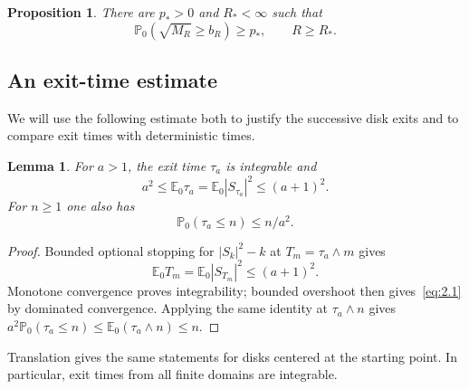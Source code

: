 \documentclass[11pt,letterpaper,reqno]{amsart}
\numberwithin{equation}{section}
\newtheorem{proposition}[theorem]{Proposition}
\newtheorem{lemma}[theorem]{Lemma}
\theoremstyle{remark}
\begin{document}
\begin{proposition}\label{prop:seed}
There are $p_*>0$ and $R_*<\infty$ such that
\begin{equation}\label{eq:1.5}
\mathbb P_0(\sqrt{M_R}\ge b_R)\ge p_*,\qquad R\ge R_*.
\end{equation}
\end{proposition}

\subsection{An exit-time estimate}
We will use the following estimate both to justify the successive disk exits and to compare exit times with deterministic times.
\begin{lemma}\label{lem:exit}
For $a>1$, the exit time $\tau_a$ is integrable and
\begin{equation}\label{eq:2.1}
a^2\le\mathbb E_0\tau_a=\mathbb E_0|S_{\tau_a}|^2\le(a+1)^2.
\end{equation}
For $n\ge1$ one also has
\begin{equation}\label{eq:2.2}
\mathbb P_0(\tau_a\le n)\le n/a^2.
\end{equation}
\end{lemma}
\begin{proof}
Bounded optional stopping for $|S_k|^2-k$ at $T_m=\tau_a\wedge m$ gives
\begin{equation}\label{eq:2.3}
\mathbb E_0T_m=\mathbb E_0|S_{T_m}|^2\le(a+1)^2.
\end{equation}
Monotone convergence proves integrability; bounded overshoot then gives~\eqref{eq:2.1} by dominated convergence. Applying the same identity at $\tau_a\wedge n$ gives $a^2\mathbb P_0(\tau_a\le n)\le\mathbb E_0(\tau_a\wedge n)\le n$.
\end{proof}
Translation gives the same statements for disks centered at the starting point. In particular, exit times from all finite domains are integrable.
\end{document}
